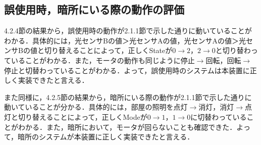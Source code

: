 \subsection{誤使用時，暗所にいる際の動作の評価}

4.2.4節の結果から，誤使用時の動作が2.1.1節で示した通りに動いていることがわかる．具体的には，光センサBの値＞光センサAの値，光センサAの値＞光センサBの値と切り替えることによって，正しくStateが$0\rightarrow 2$，$2\rightarrow 0$と切り替わっていることがわかる．また，モータの動作も同じように停止$\rightarrow$回転，回転$\rightarrow$停止と切替わっていることがわかる．よって，誤使用時のシステムは本装置に正しく実装できたと言える．

また同様に，4.2.5節の結果から，暗所にいる際の動作が2.1.1節で示した通りに動いていることが分かる．具体的には，部屋の照明を点灯$\rightarrow$消灯，消灯$\rightarrow$点灯と切り替えることによって，正しくModeが$0\rightarrow 1$，$1\rightarrow 0$に切替わっていることがわかる．また，暗所において，モータが回らないことも確認できた．よって，暗所のシステムが本装置に正しく実装できたと言える．

